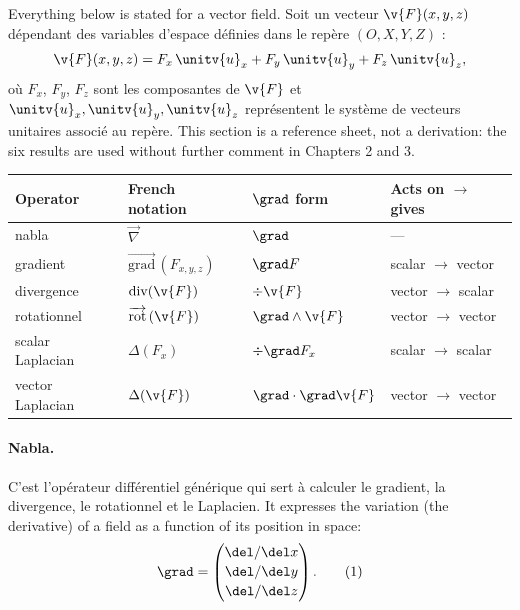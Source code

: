 Everything below is stated for a vector field. Soit un vecteur $\v{F}(x,y,z)$
dépendant des variables d'espace définies dans le repère $(O,X,Y,Z)$ :
\[
  \v{F}(x,y,z) = F_x\,\unitv{u}_x + F_y\,\unitv{u}_y + F_z\,\unitv{u}_z ,
\]
où $F_x$, $F_y$, $F_z$ sont les composantes de $\v{F}$ et
$\unitv{u}_x,\unitv{u}_y,\unitv{u}_z$ représentent le système de vecteurs
unitaires associé au repère.
This section is a reference sheet, not a derivation: the six results are used
without further comment in Chapters 2 and 3.

\begin{center}
  \begin{tabular}{llll}
    \toprule
    Operator & French notation & $\grad$ form & Acts on $\to$ gives \\
    \midrule
    nabla & $\vec{\nabla}$ & $\grad$ & --- \\
    gradient & $\overrightarrow{\mathrm{grad}}\,(F_{x,y,z})$ & $\grad F$
      & scalar $\to$ vector \\
    divergence & $\mathrm{div}(\v{F})$ & $\div\v{F}$
      & vector $\to$ scalar \\
    rotationnel & $\overrightarrow{\mathrm{rot}}\,(\v{F})$
      & $\grad\wedge\v{F}$ & vector $\to$ vector \\
    scalar Laplacian & $\Delta(F_x)$ & $\div\grad F_x$
      & scalar $\to$ scalar \\
    vector Laplacian & $\Delta(\v{F})$ & $\grad\cdot\grad\v{F}$
      & vector $\to$ vector \\
    \bottomrule
  \end{tabular}
\end{center}

\paragraph{Nabla.}
C'est l'opérateur différentiel générique qui sert à calculer le gradient, la
divergence, le rotationnel et le Laplacien. It expresses the variation (the
derivative) of a field as a function of its position in space:
\[
  \grad =
  \begin{pmatrix}
    \del/\del x \\[2pt] \del/\del y \\[2pt] \del/\del z
  \end{pmatrix}.
  \tag*{(1)}
\]

